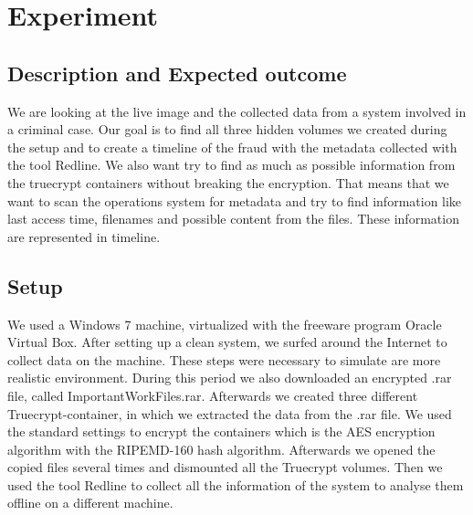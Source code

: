 \section{Experiment}
\subsection{Description and Expected outcome}
We are looking at the live image and the collected data from a system involved in a criminal case. Our goal is to find all three hidden volumes we created during the setup and to create a timeline of the fraud with the metadata collected with the tool Redline. 
We also want try to find as much as possible information from the truecrypt containers without breaking the encryption. That means that we want to scan the operations system for metadata and try to find information like last access time, filenames and possible content from the files. These information are represented in timeline.

\subsection{Setup}
We used a Windows 7 machine, virtualized with the freeware program Oracle Virtual Box. After setting up a clean system, we surfed around the Internet to collect data on the machine. 
These steps were necessary to simulate are more realistic environment.
During this period we also downloaded an encrypted .rar file, called ImportantWorkFiles.rar. Afterwards we created three different Truecrypt-container, in which we extracted the data from the .rar file.
We used the standard settings to encrypt the containers which is the AES encryption algorithm with the RIPEMD-160 hash algorithm.
Afterwards we opened the copied files several times and dismounted all the Truecrypt volumes.
Then we used the tool Redline to collect all the information of the system to analyse them offline on a different machine.

